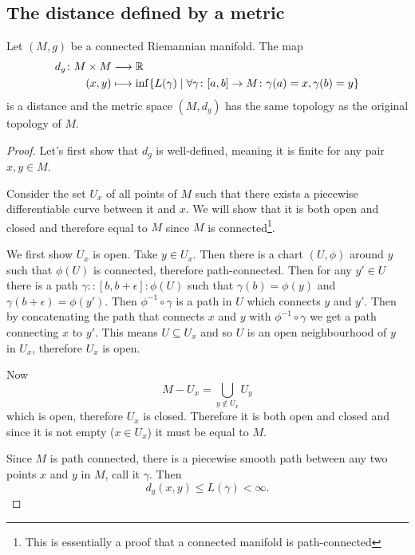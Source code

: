 \documentclass[12pt,twoside]{book}
\begin{document}
\subsection{The distance defined by a metric}
\begin{theorem}
	Let \( (M,g) \) be a connected Riemannian manifold. The map 
	\begin{align*}
		d_g \colon M \times M & \longrightarrow \mathbb{R} \\
		(x,y) & \longmapsto \inf \{ L(\gamma) \mid \forall \gamma \colon [a,b] \to M \colon
		\gamma(a) = x, \gamma(b) = y \}
	\end{align*}
	is a distance and the metric space \( (M, d_g) \) has the same topology as the original
	topology of \( M \). 
\end{theorem}
\begin{proof}
	Let's first show that \( d_g \) is well-defined, meaning it is finite for any pair \(
	x,y \in M \).
	
	Consider the set \( U_x \) of all points of \( M \) such that there exists a piecewise
	differentiable curve between it and \( x \). We will show that it is both open and
	closed and therefore equal to \( M \) since \( M \) is connected\footnote{This is
	essentially a proof that a connected manifold is path-connected}. 
	
	We first show \( U_x
	\) is open. Take \( y \in U_x \). Then there is a chart \( (U, \phi) \) around \( y \)
	such that \( \phi(U) \) is connected, therefore path-connected. Then for any \( y' \in U
	\) there is a path \( \gamma \colon \colon [b, b+\epsilon] \colon \phi(U) \) such that
	\( \gamma(b) = \phi(y) \) and \( \gamma(b+\epsilon) = \phi(y') \). Then \( \phi^{-1}
	\circ \gamma \) is a path in \( U \) which connects \( y \) and \( y' \). Then by
	concatenating the path that connects \( x \) and \( y \) with \( \phi^{-1} \circ \gamma
	\) we get a path connecting \( x \) to \( y' \). This means \( U \subseteq U_x \) and so
	\( U \) is an open neighbourhood of \( y \) in \( U_x \), therefore \( U_x \) is open. 

	Now 
	\begin{equation*}
		M - U_x = \bigcup_{y \notin U_x} U_y
	\end{equation*}
	which is open, therefore \( U_x \) is closed. Therefore it is both open and closed and
	since it is not empty (\( x \in U_x \)) it must be equal to \( M \). 

	Since \( M \) is path connected, there is a piecewise smooth path between any two points
	\( x \) and \( y \) in \( M \), call it \( \gamma \). Then
	\begin{equation*}
		d_g(x,y) \leq L(\gamma) < \infty. 
	\end{equation*}


\end{proof}
\end{document}
